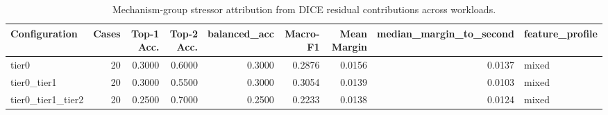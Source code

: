 \begin{table}[t]
\centering
\caption{Mechanism-group stressor attribution from DICE residual contributions across workloads.}
\label{tab:dice_stressor_diagnosis}
\footnotesize
\begin{tabular}{lrrrrrrrl}
\toprule
Configuration & Cases & Top-1 Acc. & Top-2 Acc. & balanced_acc & Macro-F1 & Mean Margin & median_margin_to_second & feature_profile \\
\midrule
tier0 & 20 & 0.3000 & 0.6000 & 0.3000 & 0.2876 & 0.0156 & 0.0137 & mixed \\
tier0_tier1 & 20 & 0.3000 & 0.5500 & 0.3000 & 0.3054 & 0.0139 & 0.0103 & mixed \\
tier0_tier1_tier2 & 20 & 0.2500 & 0.7000 & 0.2500 & 0.2233 & 0.0138 & 0.0124 & mixed \\
\bottomrule
\end{tabular}

\end{table}
